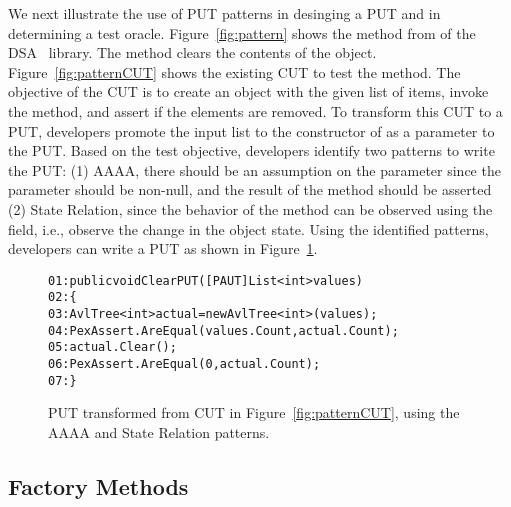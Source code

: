 We next illustrate the use of PUT patterns in desinging a PUT and in determining a test oracle. Figure~\ref{fig:pattern} shows the  method from  of the DSA~\cite{dsa} library. The  method clears the contents of the  object. Figure~\ref{fig:patternCUT} shows the existing CUT to test the  method. The objective of the CUT is to create an  object with the given list of items, invoke the  method, and assert if the elements are removed. To transform this CUT to a PUT, developers promote the input list to the constructor of  as a parameter to the PUT. Based on the test objective, developers identify two patterns to write the PUT: (1) AAAA, there should be an assumption on the parameter since the parameter should be non-null, and the result of the  method should be asserted (2) State Relation, since the behavior of the  method can be observed using the  field, i.e., observe the change in the object state. Using the identified patterns, developers can write a PUT as shown in Figure~\ref{fig:patternPUT}. 

\begin{figure}
\begin{CodeOut}        
\begin{alltt}
01: public void ClearPUT([PAUT]List<int> values)
02: \{
03: \hspace{0.07in}AvlTree<int> actual = new AvlTree<int>(values);
04: \hspace{0.07in}PexAssert.AreEqual(values.Count, actual.Count);
05: \hspace{0.07in}actual.Clear();
06: \hspace{0.07in}PexAssert.AreEqual(0, actual.Count);
07: \}
\end{alltt}
\end{CodeOut}\vspace*{-4ex}
\caption{PUT transformed from CUT in Figure~\ref{fig:patternCUT}, using the AAAA and State Relation patterns.}%
\label{fig:patternPUT}%
\end{figure}

\subsection{Factory Methods}
\label{sec:factory}

